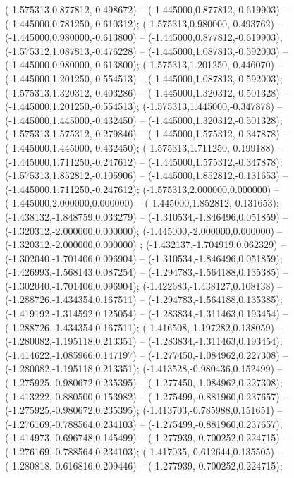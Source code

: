  (-1.575313,0.877812,-0.498672) -- (-1.445000,0.877812,-0.619903) -- (-1.445000,0.781250,-0.610312);
 (-1.575313,0.980000,-0.493762) -- (-1.445000,0.980000,-0.613800) -- (-1.445000,0.877812,-0.619903);
 (-1.575312,1.087813,-0.476228) -- (-1.445000,1.087813,-0.592003) -- (-1.445000,0.980000,-0.613800);
 (-1.575313,1.201250,-0.446070) -- (-1.445000,1.201250,-0.554513) -- (-1.445000,1.087813,-0.592003);
 (-1.575313,1.320312,-0.403286) -- (-1.445000,1.320312,-0.501328) -- (-1.445000,1.201250,-0.554513);
 (-1.575313,1.445000,-0.347878) -- (-1.445000,1.445000,-0.432450) -- (-1.445000,1.320312,-0.501328);
 (-1.575313,1.575312,-0.279846) -- (-1.445000,1.575312,-0.347878) -- (-1.445000,1.445000,-0.432450);
 (-1.575313,1.711250,-0.199188) -- (-1.445000,1.711250,-0.247612) -- (-1.445000,1.575312,-0.347878);
 (-1.575313,1.852812,-0.105906) -- (-1.445000,1.852812,-0.131653) -- (-1.445000,1.711250,-0.247612);
 (-1.575313,2.000000,0.000000) -- (-1.445000,2.000000,0.000000) -- (-1.445000,1.852812,-0.131653);
 (-1.438132,-1.848759,0.033279) -- (-1.310534,-1.846496,0.051859) -- (-1.320312,-2.000000,0.000000);
 (-1.445000,-2.000000,0.000000) -- (-1.320312,-2.000000,0.000000) ;
 (-1.432137,-1.704919,0.062329) -- (-1.302040,-1.701406,0.096904) -- (-1.310534,-1.846496,0.051859);
 (-1.426993,-1.568143,0.087254) -- (-1.294783,-1.564188,0.135385) -- (-1.302040,-1.701406,0.096904);
 (-1.422683,-1.438127,0.108138) -- (-1.288726,-1.434354,0.167511) -- (-1.294783,-1.564188,0.135385);
 (-1.419192,-1.314592,0.125054) -- (-1.283834,-1.311463,0.193454) -- (-1.288726,-1.434354,0.167511);
 (-1.416508,-1.197282,0.138059) -- (-1.280082,-1.195118,0.213351) -- (-1.283834,-1.311463,0.193454);
 (-1.414622,-1.085966,0.147197) -- (-1.277450,-1.084962,0.227308) -- (-1.280082,-1.195118,0.213351);
 (-1.413528,-0.980436,0.152499) -- (-1.275925,-0.980672,0.235395) -- (-1.277450,-1.084962,0.227308);
 (-1.413222,-0.880500,0.153982) -- (-1.275499,-0.881960,0.237657) -- (-1.275925,-0.980672,0.235395);
 (-1.413703,-0.785988,0.151651) -- (-1.276169,-0.788564,0.234103) -- (-1.275499,-0.881960,0.237657);
 (-1.414973,-0.696748,0.145499) -- (-1.277939,-0.700252,0.224715) -- (-1.276169,-0.788564,0.234103);
 (-1.417035,-0.612644,0.135505) -- (-1.280818,-0.616816,0.209446) -- (-1.277939,-0.700252,0.224715);

